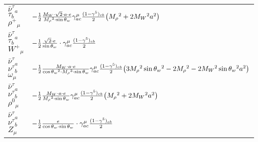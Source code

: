 \begin{center}
\begin{tabular}{|l|l|}
$\bar{\nu}^\tau{}_{a }$ \phantom{-} $\tau{}_{b }$ \phantom{-} $\rho^+{}_{\mu }$ \phantom{-}  &
	$-\frac{1}{2}\frac{ M_W \cdot\sqrt{2} \cdot a \cdot e}{ M_\rho{}^3  \cdot \sin{\theta}_w}\gamma_{a c}^\mu {(1-\gamma^5)_{c b}\over 2} \big( M_\rho{}^2 +2 M_W{}^2  a{}^2 \big)$\\[2mm]
$\bar{\nu}^\tau{}_{a }$ \phantom{-} $\tau{}_{b }$ \phantom{-} $W^+{}_{\mu }$ \phantom{-}  &
	$-\frac{1}{2}\frac{\sqrt{2} \cdot e}{ \sin{\theta}_w}\cdot \gamma_{a c}^\mu {(1-\gamma^5)_{c b}\over 2} $\\[2mm]
$\bar{\nu}^\tau{}_{a }$ \phantom{-} $\nu^\tau{}_{b }$ \phantom{-} $\omega{}_{\mu }$ \phantom{-}  &
	$-\frac{1}{2}\frac{ M_W \cdot a \cdot e}{ \cos{\theta}_w{}^2  \cdot M_\rho{}^3  \cdot \sin{\theta}_w}\gamma_{a c}^\mu {(1-\gamma^5)_{c b}\over 2} \big(3 M_\rho{}^2  \sin{\theta}_w{}^2 -2 M_\rho{}^2 -2 M_W{}^2  \sin{\theta}_w{}^2  a{}^2 \big)$\\[2mm]
$\bar{\nu}^\tau{}_{a }$ \phantom{-} $\nu^\tau{}_{b }$ \phantom{-} $\rho^0{}_{\mu }$ \phantom{-}  &
	$-\frac{1}{2}\frac{ M_W \cdot a \cdot e}{ M_\rho{}^3  \cdot \sin{\theta}_w}\gamma_{a c}^\mu {(1-\gamma^5)_{c b}\over 2} \big( M_\rho{}^2 +2 M_W{}^2  a{}^2 \big)$\\[2mm]
$\bar{\nu}^\tau{}_{a }$ \phantom{-} $\nu^\tau{}_{b }$ \phantom{-} ${Z}_{\mu }$ \phantom{-}  &
	$-\frac{1}{2}\frac{ e}{ \cos{\theta}_w \cdot \sin{\theta}_w}\cdot \gamma_{a c}^\mu {(1-\gamma^5)_{c b}\over 2} $\\ \hline
\end{tabular}


\end{center}
